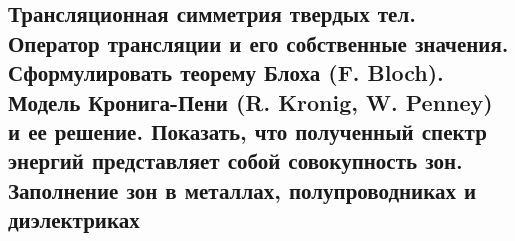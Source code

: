 \subsection{Трансляционная симметрия твердых тел. Оператор трансляции и его собственные значения.
Сформулировать теорему Блоха (F. Bloch). Модель Кронига-Пени (R. Kronig, W. Penney) и ее
решение. Показать, что полученный спектр энергий представляет собой совокупность зон.
Заполнение зон в металлах, полупроводниках и диэлектриках}


